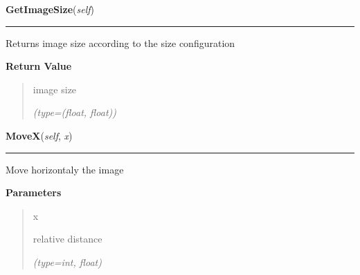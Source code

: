     \label{ImagePanel:ImagePanel:GetImageSize}

    \vspace{0.5ex}

\hspace{.8\funcindent}\begin{boxedminipage}{\funcwidth}

    \raggedright \textbf{GetImageSize}(\textit{self})

    \vspace{-1.5ex}

    \rule{\textwidth}{0.5\fboxrule}
\setlength{\parskip}{2ex}
    Returns image size according to the size configuration

\setlength{\parskip}{1ex}
      \textbf{Return Value}
    \vspace{-1ex}

      \begin{quote}
      image size

      {\it (type=(float, float))}

      \end{quote}

    \end{boxedminipage}

    \label{ImagePanel:ImagePanel:MoveX}

    \vspace{0.5ex}

\hspace{.8\funcindent}\begin{boxedminipage}{\funcwidth}

    \raggedright \textbf{MoveX}(\textit{self}, \textit{x})

    \vspace{-1.5ex}

    \rule{\textwidth}{0.5\fboxrule}
\setlength{\parskip}{2ex}
    Move horizontaly the image

\setlength{\parskip}{1ex}
      \textbf{Parameters}
      \vspace{-1ex}

      \begin{quote}
        \begin{Ventry}{x}

          \item[x]

          relative distance

            {\it (type=int, float)}

        \end{Ventry}

      \end{quote}

    \end{boxedminipage}

